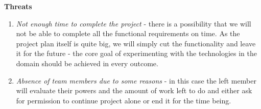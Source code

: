 \documentclass[a4paper,11pt,twoside]{report}
\theoremstyle{definition}
\begin{document}
\textbf{Threats}
\begin{enumerate}
     \item \textit{Not enough time to complete the project} - there is a possibility that we will not be able to complete all the functional requirements on time. As the project plan itself is quite big, we will simply cut the functionality and leave it for the future - the core goal of experimenting with the technologies in the domain should be achieved in every outcome. 
    \item \textit{Absence of team members due to some reasons} - in this case the left member will evaluate their powers and the amount of work left to do and either ask for permission to continue project alone or end it for the time being. 
\end{enumerate}
\end{document}
